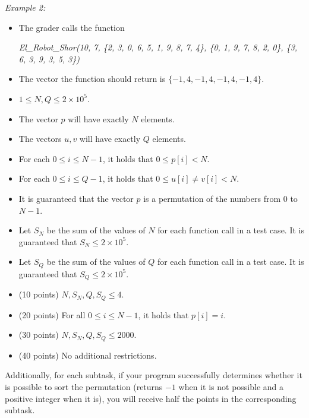 \documentclass[12pt]{scrartcl}
\begin{document}
        {\itshape Example 2:}
        \begin{itemize}
            \item The grader calls the function 
            \begin{center}
                \textit{El\_Robot\_Shor(10, 7, \{2, 3, 0, 6, 5, 1, 9, 8, 7, 4\}, \{0, 1, 9, 7, 8, 2, 0\}, \{3, 6, 3, 9, 3, 5, 3\})}
            \end{center}
            
            \item The vector the function should return is $\{-1, 4, -1, 4, -1, 4, -1, 4\}$.
        \end{itemize}
        
        \begin{itemize}
            \item $1 \le N, Q \le 2\times10^5$.
            \item The vector $p$ will have exactly $N$ elements.
            \item The vectors $u, v$ will have exactly $Q$ elements.
            \item For each $0 \le i \le N - 1$, it holds that $0 \le p[i] < N$. 
            \item For each $0 \le i \le Q - 1$, it holds that $0 \le u[i] \neq v[i] < N$.
            \item It is guaranteed that the vector $p$ is a permutation of the numbers from $0$ to $N - 1$.
            \item Let $S_N$ be the sum of the values of $N$ for each function call in a test case. It is guaranteed that $S_N \le 2 \times 10^5$.
            \item Let $S_Q$ be the sum of the values of $Q$ for each function call in a test case. It is guaranteed that $S_Q \le 2 \times 10^5$.
        \end{itemize}
    

    \begin{itemize}
        \item (10 points) $N, S_N, Q, S_Q \le 4$.
        \item (20 points) For all $0 \le i \le N - 1$, it holds that $p[i] = i$.
        \item (30 points) $N, S_N, Q, S_Q \le 2000$.
        \item (40 points) No additional restrictions.
    \end{itemize}
    Additionally, for each subtask, if your program successfully determines whether it is possible to sort the permutation (returns $-1$ when it is not possible and a positive integer when it is), you will receive half the points in the corresponding subtask.
\end{document}
